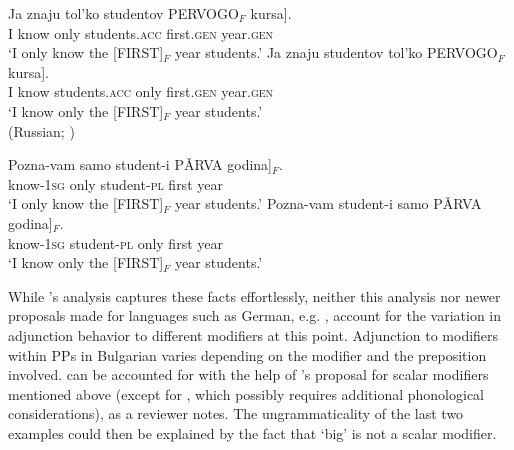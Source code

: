 \documentclass[output=paper,colorlinks,citecolor=brown]{langscibook}
\begin{document}
\ea\label{ex:DPdata:3russ}
\ea
\gll Ja znaju tol’ko \minsp{[} studentov PERVOGO$_{F}$ kursa].\\
I know only {} students.\textsc{acc} first.\textsc{gen} year.\textsc{gen}  \\
\glt `I only know the [FIRST]$_{F}$ year students.’
\ex
\gll Ja znaju \minsp{[} studentov tol’ko PERVOGO$_{F}$ kursa].\\
I know {} students.\textsc{acc} only first.\textsc{gen} year.\textsc{gen}  \\
\glt `I know only the [FIRST]$_{F}$ year students.’ \\\hfill (Russian; \citealt[ex. 32a, c]{Zanon2018})
\z 
\z 

\ea\label{ex:DPdata:3bulg}
\ea
\gll Pozna-vam samo \minsp{[} student-i P\v{A}RVA godina]$_{F}$. \\
know-\textsc{1sg} only {} student-\textsc{pl} first year  \\
\glt `I only know the [FIRST]$_{F}$ year students.’
\ex
\gll Pozna-vam student-i samo \minsp{[} P\v{A}RVA godina]$_{F}$. \\
 know-\textsc{1sg} student-\textsc{pl} only {} first year\\
\glt `I know only the [FIRST]$_{F}$ year students.’
\z
\z  

\noindent While \citeauthor{Zanon2018}'s analysis captures these facts effortlessly, neither this analysis nor newer proposals made for languages such as German, e.g. \citet{Mursell2021}, account for the variation in adjunction behavior to different modifiers at this point. Adjunction to modifiers within PPs in Bulgarian varies depending on the modifier and the preposition involved.  can be accounted for with the help of \citeauthor{Mursell2021}'s proposal for scalar modifiers mentioned above (except for , which possibly requires additional phonological considerations), as a reviewer notes. The ungrammaticality of the last two examples could then be explained by the fact that `big' is not a scalar modifier. 
\end{document}
